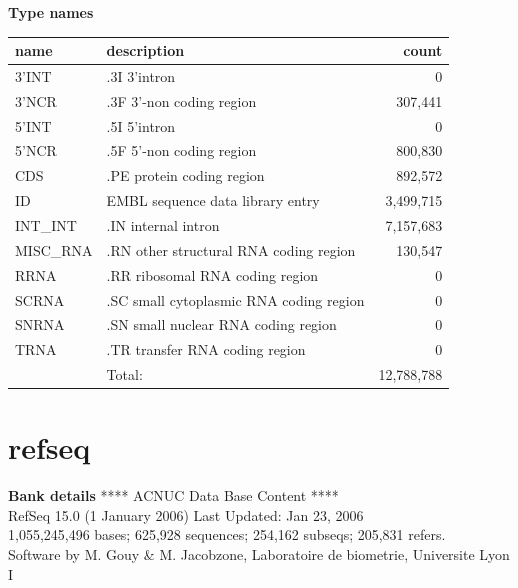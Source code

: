 \documentclass{article}
\begin{document}
\begin{Schunk}
\textbf{Type names}
\noindent\begin{tabular}{llr}
\hline \hline
name & description & count \\
\hline
3'INT  &  .3I 3'intron  &  0 \\
3'NCR  &  .3F  3'-non coding region  &  307,441 \\
5'INT  &  .5I 5'intron  &  0 \\
5'NCR  &  .5F  5'-non coding region  &  800,830 \\
CDS  &  .PE protein coding region  &  892,572 \\
ID  &  EMBL sequence data library entry  &  3,499,715 \\
INT\_INT  &  .IN  internal intron  &  7,157,683 \\
MISC\_RNA  &  .RN other structural RNA coding region  &  130,547 \\
RRNA  &  .RR ribosomal RNA coding region  &  0 \\
SCRNA  &  .SC small cytoplasmic RNA coding region  &  0 \\
SNRNA  &  .SN small nuclear RNA coding region  &  0 \\
TRNA  &  .TR transfer RNA coding region  &  0 \\
\hline
 & Total: & 12,788,788 \\
\hline \hline
\end{tabular}

\section{ refseq }
\textbf{Bank details}
             ****     ACNUC Data Base Content      ****                         \\
               RefSeq 15.0 (1 January 2006) Last Updated: Jan 23, 2006\\
1,055,245,496 bases; 625,928 sequences; 254,162 subseqs; 205,831 refers.\\
Software by M. Gouy \& M. Jacobzone, Laboratoire de biometrie, Universite Lyon I 


\end{Schunk}
\end{document}
